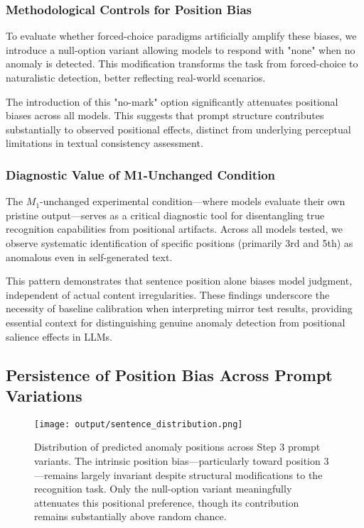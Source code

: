 \documentclass{article}
\begin{document}
\subsubsection{Methodological Controls for Position Bias}
To evaluate whether forced-choice paradigms artificially amplify these biases, we introduce a null-option variant allowing models to respond with "none" when no anomaly is detected. This modification transforms the task from forced-choice to naturalistic detection, better reflecting real-world scenarios.

The introduction of this "no-mark" option significantly attenuates positional biases across all models. This suggests that prompt structure contributes substantially to observed positional effects, distinct from underlying perceptual limitations in textual consistency assessment.

\subsubsection{Diagnostic Value of M1-Unchanged Condition}
The $M_1$-unchanged experimental condition—where models evaluate their own pristine output—serves as a critical diagnostic tool for disentangling true recognition capabilities from positional artifacts. Across all models tested, we observe systematic identification of specific positions (primarily 3rd and 5th) as anomalous even in self-generated text.

This pattern demonstrates that sentence position alone biases model judgment, independent of actual content irregularities. These findings underscore the necessity of baseline calibration when interpreting mirror test results, providing essential context for distinguishing genuine anomaly detection from positional salience effects in LLMs.

\subsection{Persistence of Position Bias Across Prompt Variations}

\begin{figure}[ht]
    \centering
    \texttt{[image: output/sentence\_distribution.png]}
\caption{Distribution of predicted anomaly positions across Step 3 prompt variants. The intrinsic position bias—particularly toward position 3—remains largely invariant despite structural modifications to the recognition task. Only the null-option variant meaningfully attenuates this positional preference, though its contribution remains substantially above random chance.}
    \label{fig:sentence_distribution}
\end{figure}
\end{document}
